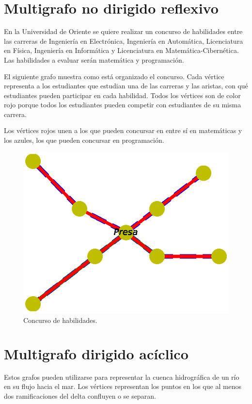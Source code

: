 \documentclass{article}
\begin{document}
\section{Multigrafo no dirigido reflexivo}

En la Universidad de Oriente se quiere realizar un concurso de habilidades entre las carreras de Ingeniería en Electrónica, Ingeniería en Automática, Licenciatura en Física, Ingeniería en Informática y Licenciatura en Matemática-Cibernética. Las habilidades a evaluar serán matemática y programación. 

El siguiente grafo muestra como está organizado el concurso. Cada vértice representa a los estudiantes que estudian una de las carreras y las aristas, con qué estudiantes pueden participar en cada habilidad. Todos los vértices son de color rojo porque todos los estudiantes pueden competir con estudiantes de su misma carrera.

Los vértices rojos unen a los que pueden concursar en entre sí en matemáticas y los azules, los que pueden concursar en programación.


\begin{figure}
  \includegraphics[width=.8\columnwidth]{8.eps}
  \caption{Concurso de habilidades.}
  \label{fig:9}
\end{figure}


\section{Multigrafo dirigido acíclico}

Estos grafos pueden utilizarse para representar la cuenca hidrográfica de un río en su flujo hacia el mar. Los vértices representan los puntos en los que al menos dos ramificaciones del delta confluyen o se separan.
\end{document}
